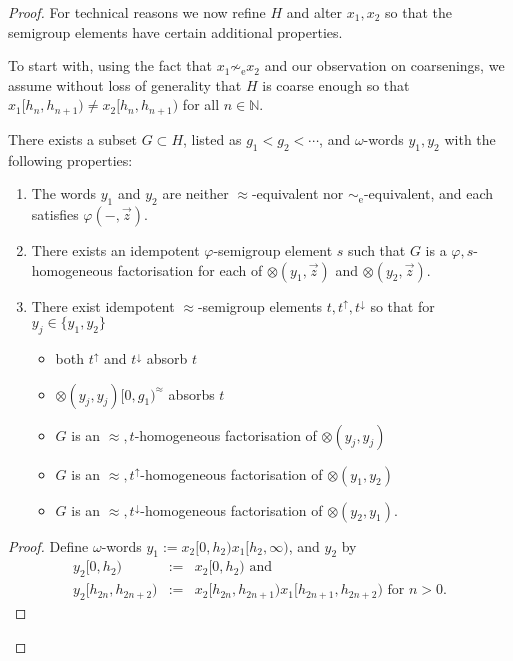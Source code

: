 \documentclass{stacs_proc}
\newcommand{\Nat}{\mathbb{N}}
\newcommand{\eqe}{\sim_{\textrm{e}}}
\begin{document}
\begin{proof}
For technical reasons we now refine $H$ and alter $x_1, x_2$ so that the
semigroup elements have certain additional properties.

To start with, using the fact that $x_1 \not\eqe x_2$ and our observation
on coarsenings, we assume without loss of generality that $H$ is coarse enough
so that $x_1[h_n,h_{n+1}) \neq x_2[h_n,h_{n+1})$ for all $n \in \Nat$.


\begin{lemma} \label{lemma_ab}
There exists a subset $G \subset H$, listed as $g_1 < g_2 <
\cdots$, and $\omega$-words $y_1,y_2$ with the following properties:
\begin{enumerate}

\item The words $y_1$ and $y_2$ are neither $\approx$-equivalent 
      nor $\eqe$-equivalent, and each satisfies $\varphi(-,\vec{z})$.

\item There exists an idempotent $\varphi$-semigroup element $s$ 
      such that $G$ is a $\varphi,s$-homogeneous factorisation 
      for each of $\otimes(y_1,\vec{z})$ and $\otimes(y_2,\vec{z})$. 

\item There exist idempotent $\approx$-semigroup elements
      $t,t^\uparrow,t^\downarrow$ so that for $y_j \in \{y_1,y_2\}$ 
\begin{itemize}
\item both $t^\uparrow$ and $t^\downarrow$ absorb $t$
\item $\otimes(y_j,y_j)[0,g_1)^\approx$ absorbs $t$
\item $G$ is an $\approx,t$-homogeneous factorisation of $\otimes(y_j,y_j)$
\item $G$ is an $\approx,t^\uparrow$-homogeneous factorisation of $\otimes(y_1,y_2)$
\item $G$ is an $\approx,t^\downarrow$-homogeneous factorisation of $\otimes(y_2,y_1)$.
\end{itemize}
\end{enumerate}
\end{lemma}

\begin{proof}
Define $\omega$-words 
$y_1:=x_2[0,h_2)x_1[h_2,\infty)$, and $y_2$ by
\begin{eqnarray*}
y_2[0,h_2) & := & x_2[0,h_2) \text{ and}\\
y_2[h_{2n},h_{2n+2}) & := & x_2[h_{2n},h_{2n+1}) x_1[h_{2n+1},h_{2n+2}) \text{ for } n > 0.
\end{eqnarray*}


\end{proof}
\end{proof}
\end{document}
